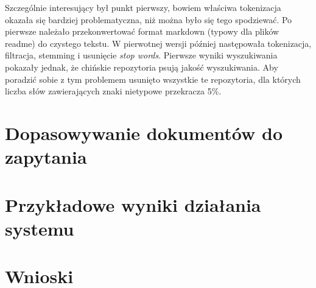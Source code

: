 \documentclass[12pt, oneside, final]{report}
\begin{document}
Szczególnie interesujący był punkt pierwszy, bowiem właściwa tokenizacja okazała się bardziej problematyczna, niż można było się tego spodziewać. Po pierwsze należało przekonwertować format markdown (typowy dla plików readme) do czystego tekstu. W pierwotnej wersji później następowała tokenizacja, filtracja, stemming i usunięcie \textit{stop words}. Pierwsze wyniki wyszukiwania pokazały jednak, że chińskie repozytoria psują jakość wyszukiwania. Aby poradzić sobie z tym problemem usunięto wszystkie te repozytoria, dla których liczba słów zawierających znaki nietypowe przekracza 5\%.

\section*{Dopasowywanie dokumentów do zapytania}

\section*{Przykładowe wyniki działania systemu}

\section*{Wnioski}
\end{document}
